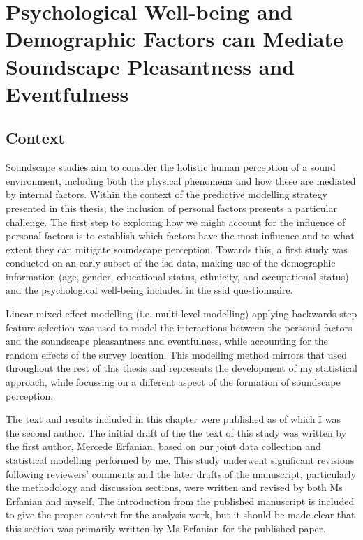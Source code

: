 \chapter{Psychological Well-being and Demographic Factors can Mediate Soundscape Pleasantness and Eventfulness}
\label{ch:whostudy}

\section*{Context}

 Soundscape studies aim to consider the holistic human perception of a sound environment, including both the physical phenomena and how these are mediated by internal factors. Within the context of the predictive modelling strategy presented in this thesis, the inclusion of personal factors presents a particular challenge. The first step to exploring how we might account for the influence of personal factors is to establish which factors have the most influence and to what extent they can mitigate soundscape perception. Towards this, a first study was conducted on an early subset of the \gls{isd} data, making use of the demographic information (age, gender, educational status, ethnicity, and occupational status) and the psychological well-being included in the \gls{ssid} questionnaire. 

Linear mixed-effect modelling (i.e. multi-level modelling) applying backwards-step feature selection was used to model the interactions between the personal factors and the soundscape pleasantness and eventfulness, while accounting for the random effects of the survey location. This modelling method mirrors that used throughout the rest of this thesis and represents the development of my statistical approach, while focussing on a different aspect of the formation of soundscape perception. 

 The text and results included in this chapter were published as \citep{Erfanian2021Psychological} of which I was the second author. The initial draft of the the text of this study was written by the first author, Mercede Erfanian, based on our joint data collection and statistical modelling performed by me. This study underwent significant revisions following reviewers' comments and the later drafts of the manuscript, particularly the methodology and discussion sections, were written and revised by both Ms Erfanian and myself. The introduction from the published manuscript is included to give the proper context for the analysis work, but it should be made clear that this section was primarily written by Ms Erfanian for the published paper.

